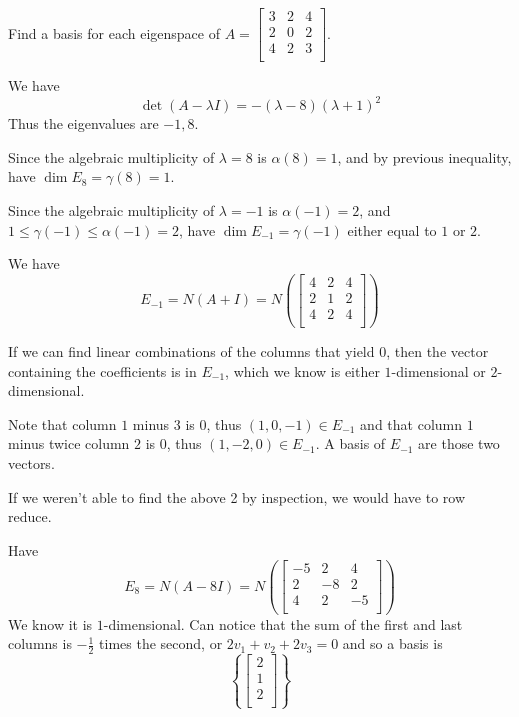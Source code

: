 \documentclass{article}
\begin{document}
\begin{example}
  Find a basis for each eigenspace of $A =
    \begin{bmatrix}
      3 & 2 & 4 \\
      2 & 0 & 2 \\
      4 & 2 & 3 \\
    \end{bmatrix}$.

  We have \[
    \det (A - \lambda I) = -(\lambda - 8)(\lambda + 1)^2
  \]
  Thus the eigenvalues are $-1, 8$.

  Since the algebraic multiplicity of $\lambda = 8$ is $\alpha(8) = 1$, and by previous inequality, have $\dim E_8 = \gamma(8) = 1$.

  Since the algebraic multiplicity of $\lambda = -1$ is $\alpha(-1) = 2$, and $1 \leq \gamma(-1) \leq \alpha(-1) = 2$, have $\dim E_{-1} = \gamma(-1)$ either equal to $1$ or $2$.

  We have \[
    E_{-1} = N(A + I) = N\left(
    \begin{bmatrix}
        4 & 2 & 4 \\
        2 & 1 & 2 \\
        4 & 2 & 4 \\
      \end{bmatrix}\right)
  \]

  If we can find linear combinations of the columns that yield $0$, then the vector containing the coefficients is in $E_{-1}$, which we know is either $1$-dimensional or $2$-dimensional.

  Note that column $1$ minus $3$ is $0$, thus $(1, 0, -1) \in E_{-1}$ and that column $1$ minus twice column $2$ is $0$, thus $(1, -2, 0) \in E_{-1}$. A basis of $E_{-1}$ are those two vectors.

  If we weren't able to find the above 2 by inspection, we would have to row reduce.

  Have \[
    E_8 = N(A - 8I) = N\left(
    \begin{bmatrix}
        -5 & 2  & 4  \\
        2  & -8 & 2  \\
        4  & 2  & -5 \\
      \end{bmatrix}\right)
  \]
  We know it is $1$-dimensional. Can notice that the sum of the first and last columns is $-\frac{1}{2}$ times the second, or $2v_1 + v_2 + 2v_3 = 0$ and so a basis is \[
    \left\{
    \begin{bmatrix}
      2 \\1\\2\\
    \end{bmatrix}\right\}
  \]
\end{example}
\end{document}
